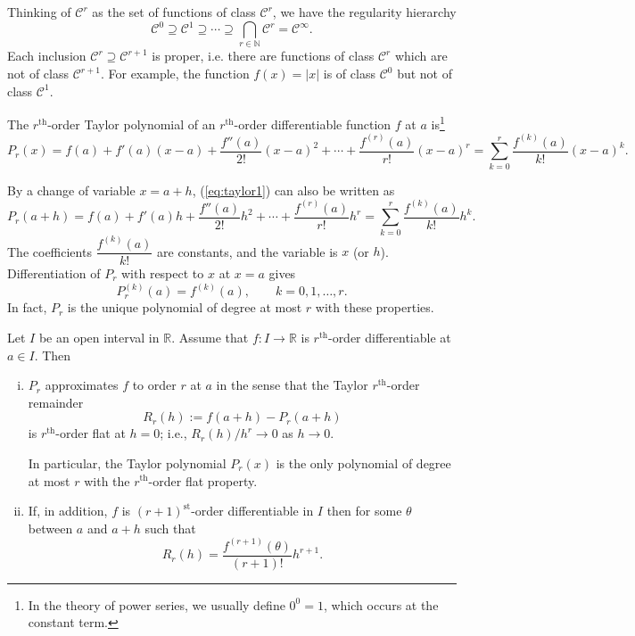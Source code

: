 Thinking of $\mathcal{C}^r$ as the set of functions of class $\mathcal{C}^r$, we have the regularity hierarchy
\[
  \mathcal{C}^0 \supseteq \mathcal{C}^1 \supseteq \cdots \supseteq \bigcap_{r \in \mathbb{N}} \mathcal{C}^r = \mathcal{C}^\infty.
\]
Each inclusion $\mathcal{C}^r \supseteq \mathcal{C}^{r+1}$ is proper, i.e. there are functions of class $\mathcal{C}^r$ which are not of class $\mathcal{C}^{r+1}$.
For example, the function $f(x) = |x|$ is of class $\mathcal{C}^0$ but not of class $\mathcal{C}^1$.

The $r^{\text{th}}$-order \textsf{Taylor polynomial} of an $r^{\text{th}}$-order differentiable function $f$ at $a$ is\footnote{In the theory of power series, we usually define $0^0 = 1$, which occurs at the constant term.}
\begin{equation}
  \label{eq:taylor1}
  P_r(x) = f(a) + f'(a) (x-a) + \frac{f''(a)}{2!} (x-a)^2 + \cdots + \frac{f^{(r)}(a)}{r!} (x-a)^r = \sum_{k=0}^r \frac{ f^{(k)}(a) }{k!} (x-a)^k.
\end{equation}

By a change of variable $x = a + h$, (\ref{eq:taylor1}) can also be written as
\begin{equation}
  \label{eq:taylor2}
  P_r(a+h) = f(a) + f'(a) h + \frac{f''(a)}{2!} h^2 + \cdots + \frac{f^{(r)}(a)}{r!} h^r = \sum_{k=0}^r \frac{ f^{(k)}(a) }{k!} h^k.
\end{equation}
The coefficients $\dfrac{f^{(k)}(a)}{k!}$ are constants, and the variable is $x$ (or $h$).
Differentiation of $P_r$ with respect to $x$ at $x = a$ gives
\[
  P_r^{(k)}(a) = f^{(k)}(a), \qquad k = 0, 1, \dots, r.
\]
In fact, $P_r$ is the unique polynomial of degree at most $r$ with these properties.

\begin{thm}
  Let $I$ be an open interval in $\mathbb{R}$.
  Assume that $f: I \to \mathbb{R}$ is $r^{\text{th}}$-order differentiable at $a \in I$.  Then
  \begin{enumerate}[(i)]
    \item $P_r$ approximates $f$ to order $r$ at $a$ in the sense that the Taylor \textsf{$r^{\text{th}}$-order remainder}
      \[
        R_r(h) := f(a+h) - P_r(a+h)
      \]
      is $r^{\text{th}}$-order flat at $h = 0$; i.e., $R_r(h) / h^r \to 0$ as $h \to 0$.

      In particular, the Taylor polynomial $P_r(x)$ is the only polynomial of degree at most $r$ with the $r^{\text{th}}$-order flat property.

    \item If, in addition, $f$ is $(r+1)^{\text{st}}$-order differentiable in $I$ then for some $\theta$ between $a$ and $a+h$ such that
      \begin{equation}
	\label{eq:r-remainder}
	R_r(h) = \frac{ f^{(r+1)}(\theta) }{ (r+1)! } h^{r+1}.
      \end{equation}
  \end{enumerate}
\end{thm}

